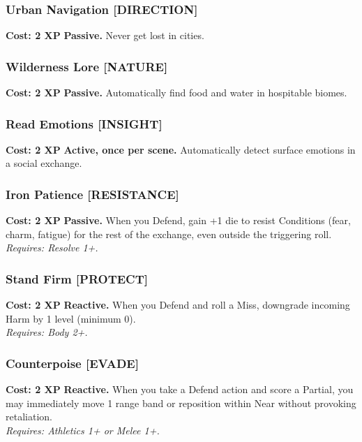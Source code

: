 \subsubsection*{Urban Navigation \textnormal{[DIRECTION]}}
\label{talent:urban-navigation}
\textbf{Cost: 2 XP} \textbf{Passive.} Never get lost in cities.

\subsubsection*{Wilderness Lore \textnormal{[NATURE]}}
\label{talent:wilderness-lore}
\textbf{Cost: 2 XP} \textbf{Passive.} Automatically find food and water in hospitable biomes.

\subsubsection*{Read Emotions \textnormal{[INSIGHT]}}
\label{talent:read-emotions}
\textbf{Cost: 2 XP} \textbf{Active, once per scene.} Automatically detect surface emotions in a social exchange.

\subsubsection*{Iron Patience \textnormal{[RESISTANCE]}}
\label{talent:iron-patience}
\textbf{Cost: 2 XP} \textbf{Passive.} When you Defend, gain +1 die to resist Conditions (fear, charm, fatigue) for the rest of the exchange, even outside the triggering roll. \\
\textit{Requires: Resolve 1+.}

\subsubsection*{Stand Firm \textnormal{[PROTECT]}}
\label{talent:stand-firm}
\textbf{Cost: 2 XP} \textbf{Reactive.} When you Defend and roll a Miss, downgrade incoming Harm by 1 level (minimum 0). \\
\textit{Requires: Body 2+.}

\subsubsection*{Counterpoise \textnormal{[EVADE]}}
\label{talent:counterpoise}
\textbf{Cost: 2 XP} \textbf{Reactive.} When you take a Defend action and score a Partial, you may immediately move 1 range band or reposition within Near without provoking retaliation. \\
\textit{Requires: Athletics 1+ or Melee 1+.}

